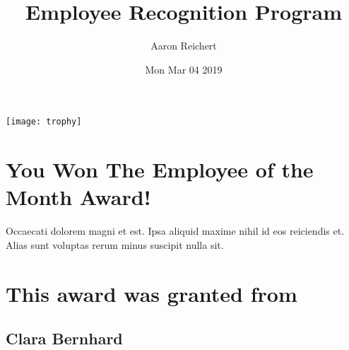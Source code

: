 \documentclass[12pt, letterpaper]{article}
\title{Employee Recognition Program}
\author{Aaron Reichert}
\date{Mon Mar 04 2019}
\begin{document}
\maketitle
\begin{center}
\texttt{[image: trophy]}
\section*{You Won The Employee of the Month Award!}
Occaecati dolorem magni et est. Ipsa aliquid maxime nihil id eos reiciendis et. Alias sunt voluptas rerum minus suscipit nulla sit.
\section*{This award was granted from}
\subsection*{Clara Bernhard}
\end{center}
\end{document}
